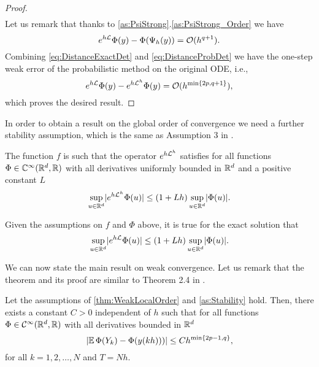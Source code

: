 \documentclass[final,onefignum,onetabnum]{siamonline171218}
\begin{document}
\begin{proof}
\begin{equation}
\begin{aligned}
		\end{aligned}
	\end{equation}
	Let us remark that thanks to \cref{as:PsiStrong}.\ref{as:PsiStrong_Order} we have
	\begin{equation}\label{eq:DistanceExactDet}
		e^{h\diffL}\Phi(y) - \Phi(\Psi_h(y)) = \OO(h^{q+1}).
	\end{equation}
	Combining \eqref{eq:DistanceExactDet} and \eqref{eq:DistanceProbDet} we have the one-step weak error of the probabilistic method on the original ODE, i.e., 
	\begin{equation}\label{eq:LocalWeakError}
		e^{h\diffL}\Phi(y) - e^{h\diffL^h}\Phi(y) = \OO(h^{\min\{2p, q+1\}}),
	\end{equation}
	which proves the desired result.
\end{proof}

In order to obtain a result on the global order of convergence we need a further stability assumption, which is the same as Assumption 3 in \cite{CGS16}.

\begin{assumption}\label{as:Stability} The function $f$ is such that the operator $e^{h\mathcal{L}^h}$ satisfies for all functions $\Phi\in\mathbb{C}^{\infty}(\mathbb{R}^d, \mathbb{R})$ with all derivatives uniformly bounded in $\mathbb{R}^d$ and a positive constant $L$
	\begin{equation}
		\sup_{u\in\mathbb{R}^d} \lvert e^{h\mathcal{L}^h}\Phi(u)\rvert \leq (1 + Lh)\sup_{u\in\mathbb{R}^d}\lvert\Phi(u)\rvert.
	\end{equation}
\end{assumption}
\begin{remark} Given the assumptions on $f$ and $\Phi$ above, it is true for the exact solution that
	\begin{equation}
		\sup_{u\in\mathbb{R}^d} \lvert e^{h\mathcal{L}}\Phi(u)\rvert \leq (1 + Lh)\sup_{u\in\mathbb{R}^d}\lvert\Phi(u)\rvert.
	\end{equation}
\end{remark}

We can now state the main result on weak convergence. Let us remark that the theorem and its proof are similar to Theorem 2.4 in \cite{CGS16}.

\begin{theorem}\label{thm:weakOrder} Let the assumptions of \cref{thm:WeakLocalOrder} and \cref{as:Stability} hold. Then, there exists a constant $C > 0$ independent of $h$ such that for all functions $\Phi \in \mathcal{C}^\infty(\mathbb{R}^d,\mathbb{R})$ with all derivatives bounded in $\mathbb{R}^d$
	\begin{equation}
		\lvert\operatorname{\mathbb{E}}\Phi(Y_k) - \Phi(y(kh)))\rvert \leq Ch^{\min\{2p - 1, q\}},
	\end{equation}
	for all $k = 1, 2, \ldots, N$ and $T = Nh$.
\end{theorem}
	
\end{document}
